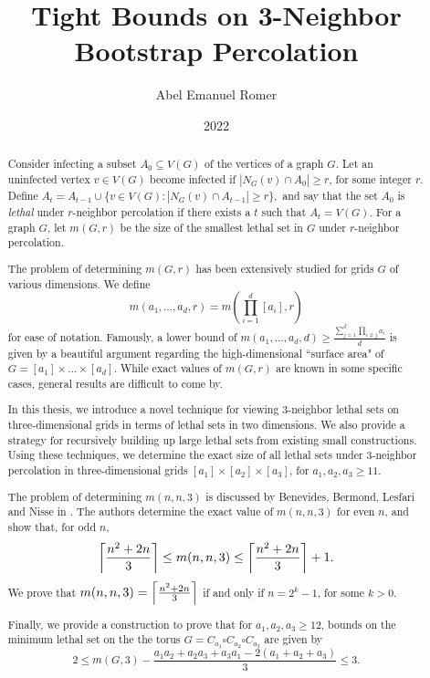 \documentclass[12pt,oneside]{sigmasthesis}
\title{Tight Bounds on 3-Neighbor Bootstrap Percolation}			%
\author{Abel Emanuel Romer}			%
\date{2022}				%
\DeclarePairedDelimiter\ceil{\lceil}{\rceil}
\theoremstyle{definition}
\begin{document}
\frontmatter 	%


\makecommittee	%

\begin{abstract}
Consider infecting a subset $A_0 \subseteq V(G)$ of the vertices of a graph $G$. Let an uninfected vertex $v \in V(G)$ become infected if $|N_G(v) \cap A_0| \geq r$, for some integer $r$. Define $A_t = A_{t-1} \cup \{v \in V(G) : |N_G(v) \cap A_{t-1}| \geq r \},$ and say that the set $A_0$ is \emph{lethal} under $r$-neighbor percolation if there exists a $t$ such that $A_t = V(G)$. For a graph $G$, let $m(G,r)$ be the size of the smallest lethal set in $G$ under $r$-neighbor percolation. 

The problem of determining $m(G,r)$ has been extensively studied for grids $G$ of various dimensions. We define 
$$m(a_1, \dots, a_d, r) = m\left (\prod_{i=1}^d [a_i], r\right )$$
for ease of notation. Famously, a lower bound of $m(a_1, \dots, a_d, d) \geq \frac{\sum_{j=1}^d \prod_{i \neq j} a_i}{d}$ is given by a beautiful argument regarding the high-dimensional ``surface area" of $G = [a_1] \times \dots \times [a_d]$. While exact values of $m(G,r)$ are known in some specific cases, general results are difficult to come by.

In this thesis, we introduce a novel technique for viewing $3$-neighbor lethal sets on three-dimensional grids in terms of lethal sets in two dimensions. We also provide a strategy for recursively building up large lethal sets from existing small constructions. Using these techniques, we determine the exact size of all lethal sets under 3-neighbor percolation in three-dimensional grids $[a_1] \times [a_2] \times [a_3]$, for $a_1,a_2,a_3 \geq 11$. 

The problem of determining $m(n,n,3)$ is discussed by Benevides, Bermond, Lesfari and Nisse in \cite{benevides:2021}. The authors determine the exact value of $m(n,n,3)$ for even $n$, and show that, for odd $n$,
$$\ceil*{\frac{n^2+2n}{3}} \leq m(n,n,3) \leq \ceil*{\frac{n^2+2n}{3}} + 1.$$
We prove that $m(n,n,3) = \ceil*{\frac{n^2+2n}{3}}$ if and only if $n = 2^k-1$, for some $k >0$.

Finally, we provide a construction to prove that for $a_1,a_2,a_3 \geq 12$, bounds on the minimum lethal set on the the torus $G = C_{a_1} \square C_{a_2} \square C_{a_3}$ are given by
$$2 \le m(G,3) - \frac{a_1a_2 + a_2a_3 + a_3a_1 -2(a_1+a_2+a_3)}{3} \le 3.$$
\end{abstract}
\end{document}

